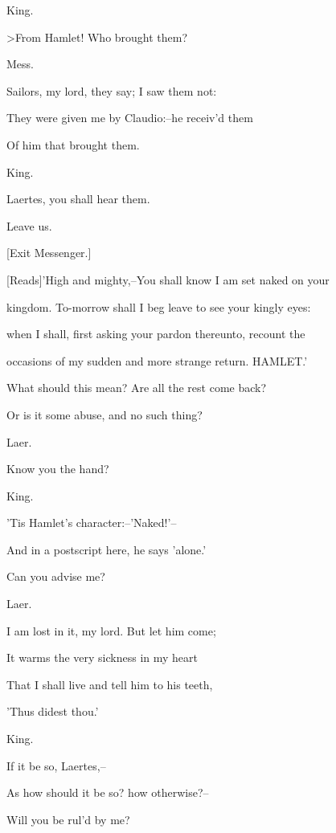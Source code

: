\documentclass[12pt]{book}
\begin{document}
King.

>From Hamlet! Who brought them?



Mess.

Sailors, my lord, they say; I saw them not:

They were given me by Claudio:--he receiv'd them

Of him that brought them.



King.

Laertes, you shall hear them.

Leave us.



[Exit Messenger.]



[Reads]'High and mighty,--You shall know I am set naked on your

kingdom. To-morrow shall I beg leave to see your kingly eyes:

when I shall, first asking your pardon thereunto, recount the

occasions of my sudden and more strange return.       HAMLET.'



What should this mean? Are all the rest come back?

Or is it some abuse, and no such thing?



Laer.

Know you the hand?



King.

'Tis Hamlet's character:--'Naked!'--

And in a postscript here, he says 'alone.'

Can you advise me?



Laer.

I am lost in it, my lord. But let him come;

It warms the very sickness in my heart

That I shall live and tell him to his teeth,

'Thus didest thou.'



King.

If it be so, Laertes,--

As how should it be so? how otherwise?--

Will you be rul'd by me?
\end{document}
